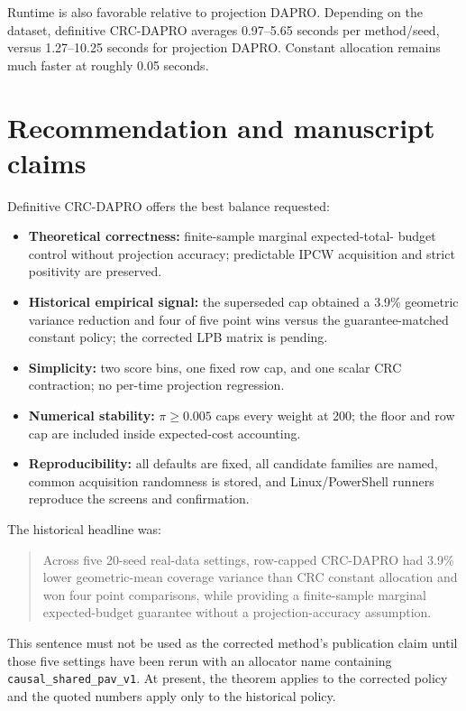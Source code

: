 \documentclass[10pt]{article}
\newcounter{assumption}
\begin{document}
Runtime is also favorable relative to projection DAPRO.  Depending on the
dataset, definitive CRC-DAPRO averages 0.97--5.65 seconds per method/seed,
versus 1.27--10.25 seconds for projection DAPRO.  Constant allocation remains
much faster at roughly 0.05 seconds.

\section{Recommendation and manuscript claims}

Definitive CRC-DAPRO offers the best balance requested:
\begin{itemize}
\item \textbf{Theoretical correctness:} finite-sample marginal expected-total-
budget control without projection accuracy; predictable IPCW acquisition and
strict positivity are preserved.
\item \textbf{Historical empirical signal:} the superseded cap obtained a
3.9\% geometric variance reduction and four of five point wins versus the
guarantee-matched constant policy; the corrected LPB matrix is pending.
\item \textbf{Simplicity:} two score bins, one fixed row cap, and one scalar
CRC contraction; no per-time projection regression.
\item \textbf{Numerical stability:} $\pi\ge0.005$ caps every weight at 200;
the floor and row cap are included inside expected-cost accounting.
\item \textbf{Reproducibility:} all defaults are fixed, all candidate families
are named, common acquisition randomness is stored, and Linux/PowerShell
runners reproduce the screens and confirmation.
\end{itemize}

The historical headline was:
\begin{quote}
Across five 20-seed real-data settings, row-capped CRC-DAPRO had 3.9\% lower
geometric-mean coverage variance than CRC constant allocation and won four
point comparisons, while providing a finite-sample marginal expected-budget
guarantee without a projection-accuracy assumption.
\end{quote}
This sentence must not be used as the corrected method's publication claim
until those five settings have been rerun with an allocator name containing
\texttt{causal\_shared\_pav\_v1}.  At present, the theorem applies to the
corrected policy and the quoted numbers apply only to the historical policy.
\end{document}
